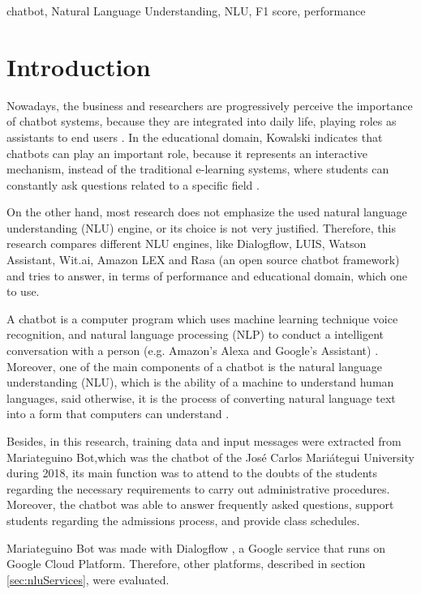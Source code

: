 \documentclass[conference]{IEEEtran}
\begin{document}
\begin{IEEEkeywords}
    chatbot, Natural Language Understanding, NLU, F1 score, performance
\end{IEEEkeywords}

\section{Introduction}
Nowadays, the business and researchers are progressively perceive the importance of chatbot systems, because they are integrated into daily life, playing roles as assistants to end users \cite{Bird2018}. In the educational domain, Kowalski indicates that chatbots can play an important role, because it represents an interactive mechanism, instead of the traditional e-learning systems, where students can constantly ask questions related to a specific field \cite{Kowalski2011}.

On the other hand, most research does not emphasize the used natural language understanding (NLU) engine, or its choice is not very justified. Therefore, this research compares different NLU engines, like Dialogflow, LUIS, Watson Assistant, Wit.ai, Amazon LEX and Rasa (an open source chatbot framework) and tries to answer, in terms of performance and educational domain, which one to use.

A chatbot is a computer program which uses machine learning technique voice recognition, and natural language processing (NLP) to conduct a intelligent conversation with a person (e.g. Amazon's Alexa and Google's Assistant) \cite{mittal2019getting}. Moreover, one of the main components of a chatbot is the natural language understanding (NLU), which is the ability of a machine to understand human languages, said otherwise, it is the process of converting natural language text into a form that computers can understand \cite{pathak2017artificial}.

Besides, in this research, training data and input messages were extracted from Mariateguino Bot,which was the chatbot of the José Carlos Mariátegui University during 2018, its main function was to attend to the doubts of the students regarding the necessary requirements to carry out administrative procedures. Moreover, the chatbot was able to answer frequently asked questions, support students regarding the admissions process, and provide class schedules.

Mariateguino Bot was made with Dialogflow \cite{dialogflow2020}, a Google service that runs on Google Cloud Platform. Therefore, other platforms, described in section \ref{sec:nluServices}, were evaluated.
\end{document}
